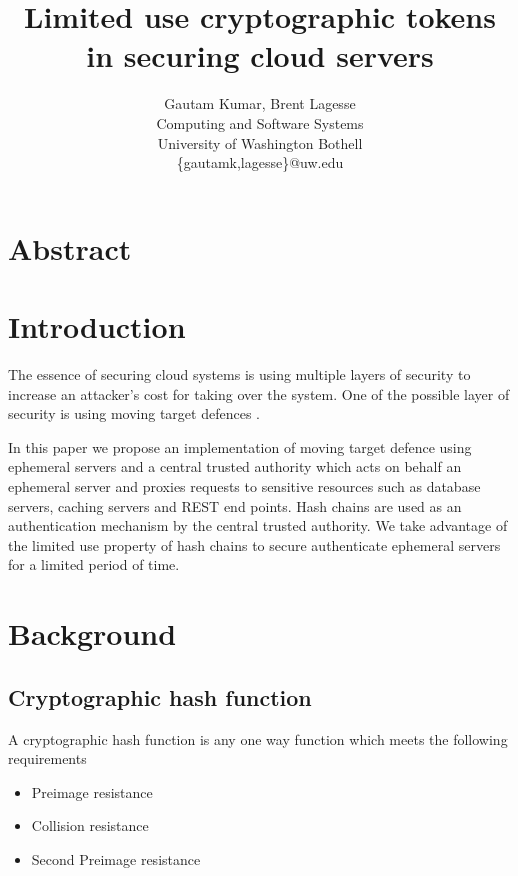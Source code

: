 \documentclass[12pt,conference]{IEEEtran}
\begin{document}
\title{Limited use cryptographic tokens in securing cloud servers}


\author{
{\rm Gautam Kumar, Brent Lagesse}\\
Computing and Software Systems\\
University of Washington Bothell\\
\{gautamk,lagesse\}@uw.edu
} %

\maketitle
\thispagestyle{empty}


\section*{Abstract}
\section*{Introduction}

The essence of securing cloud systems is using multiple layers \cite{panwar_layered_2011} of security to increase an attacker's cost for taking over the system. One of the possible layer of security is using moving target defences \cite{evans_effectiveness_2011}. 

In this paper we propose an implementation of moving target defence using ephemeral servers and a central trusted authority which acts on behalf an ephemeral server and proxies requests to sensitive resources such as database servers, caching servers and REST end points. Hash chains are used as an authentication mechanism by the central trusted authority. We take advantage of the limited use property of hash chains to secure authenticate ephemeral servers for a limited period of time.

\section*{Background}
\subsection*{Cryptographic hash function \cite{rogaway_cryptographic_2004}} 
A cryptographic hash function is any one way function which meets the following requirements 
\begin{itemize} 
\item Preimage resistance
\item Collision resistance
\item Second Preimage resistance
\end{itemize}
\end{document}
